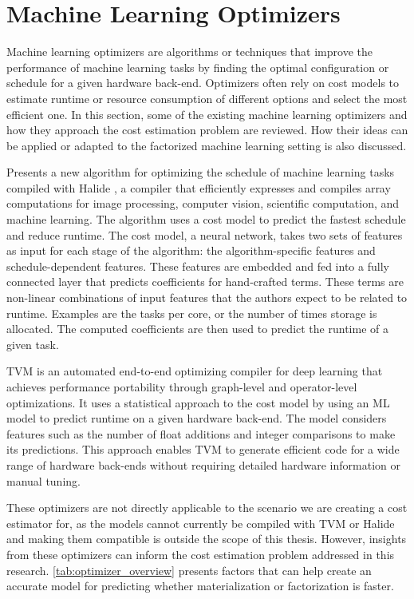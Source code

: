 \section{Machine Learning Optimizers}
\label{sec:3-ml-optimizers}
Machine learning optimizers are algorithms or techniques that improve the performance of machine learning tasks by finding the optimal configuration or schedule for a given hardware back-end. Optimizers often rely on cost models to estimate runtime or resource consumption of different options and select the most efficient one. In this section, some of the existing machine learning optimizers and how they approach the cost estimation problem are reviewed. How their ideas can be applied or adapted to the factorized machine learning setting is also discussed.

\cite{halide_cost_model} Presents a new algorithm for optimizing the schedule of machine learning tasks compiled with Halide \cite{halide}, a compiler that efficiently expresses and compiles array computations for image processing, computer vision, scientific computation, and machine learning. The algorithm uses a cost model to predict the fastest schedule and reduce runtime. The cost model, a neural network, takes two sets of features as input for each stage of the algorithm: the algorithm-specific features and schedule-dependent features. These features are embedded and fed into a fully connected layer that predicts coefficients for hand-crafted terms. These terms are non-linear combinations of input features that the authors expect to be related to runtime. Examples are the tasks per core, or the number of times storage is allocated. The computed coefficients are then used to predict the runtime of a given task.

TVM \cite{tvm} is an automated end-to-end optimizing compiler for deep learning that achieves performance portability through graph-level and operator-level optimizations. It uses a statistical approach to the cost model by using an ML model to predict runtime on a given hardware back-end. The model considers features such as the number of float additions and integer comparisons to make its predictions. This approach enables TVM to generate efficient code for a wide range of hardware back-ends without requiring detailed hardware information or manual tuning.

These optimizers are not directly applicable to the scenario we are creating a cost estimator for, as the models cannot currently be compiled with TVM or Halide and making them compatible is outside the scope of this thesis. However, insights from these optimizers can inform the cost estimation problem addressed in this research. \autoref{tab:optimizer_overview} presents factors that can help create an accurate model for predicting whether materialization or factorization is faster. 

